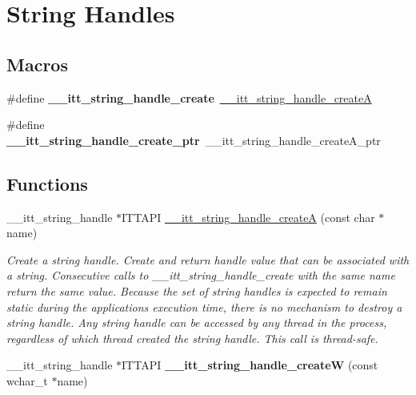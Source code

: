 \hypertarget{group__handless}{}\section{String Handles}
\label{group__handless}
\subsection*{Macros}
\begin{DoxyCompactItemize}
\item 
\hypertarget{group__handless_ga0a723522866c77dbe13ace2d32ee429c}{}\#define {\bfseries \+\_\+\+\_\+itt\+\_\+string\+\_\+handle\+\_\+create}~\hyperlink{group__handless_ga353ab13a4b9325ded923c1c951f6f849}{\+\_\+\+\_\+itt\+\_\+string\+\_\+handle\+\_\+create\+A}\label{group__handless_ga0a723522866c77dbe13ace2d32ee429c}

\item 
\hypertarget{group__handless_ga4af0e0826a5b33bf0d9ed25746419936}{}\#define {\bfseries \+\_\+\+\_\+itt\+\_\+string\+\_\+handle\+\_\+create\+\_\+ptr}~\+\_\+\+\_\+itt\+\_\+string\+\_\+handle\+\_\+create\+A\+\_\+ptr\label{group__handless_ga4af0e0826a5b33bf0d9ed25746419936}

\end{DoxyCompactItemize}
\subsection*{Functions}
\begin{DoxyCompactItemize}
\item 
\+\_\+\+\_\+itt\+\_\+string\+\_\+handle $\ast$I\+T\+T\+A\+P\+I \hyperlink{group__handless_ga353ab13a4b9325ded923c1c951f6f849}{\+\_\+\+\_\+itt\+\_\+string\+\_\+handle\+\_\+create\+A} (const char $\ast$name)
\begin{DoxyCompactList}\small\item\em Create a string handle. Create and return handle value that can be associated with a string. Consecutive calls to \+\_\+\+\_\+itt\+\_\+string\+\_\+handle\+\_\+create with the same name return the same value. Because the set of string handles is expected to remain static during the application\textquotesingle{}s execution time, there is no mechanism to destroy a string handle. Any string handle can be accessed by any thread in the process, regardless of which thread created the string handle. This call is thread-\/safe. \end{DoxyCompactList}\item 
\hypertarget{group__handless_ga01b031a1ec465e650ccfacae18a3c121}{}\+\_\+\+\_\+itt\+\_\+string\+\_\+handle $\ast$I\+T\+T\+A\+P\+I {\bfseries \+\_\+\+\_\+itt\+\_\+string\+\_\+handle\+\_\+create\+W} (const wchar\+\_\+t $\ast$name)\label{group__handless_ga01b031a1ec465e650ccfacae18a3c121}

\end{DoxyCompactItemize}


